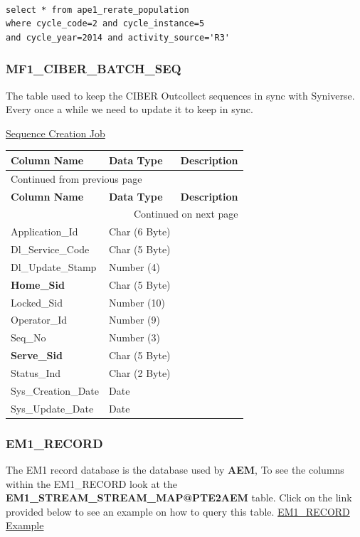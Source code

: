 \documentclass[12pt,twoside]{article}
\begin{document}
\begin{verbatim}

select * from ape1_rerate_population 
where cycle_code=2 and cycle_instance=5 
and cycle_year=2014 and activity_source='R3'
\end{verbatim}

\subsubsection{MF1\_CIBER\_BATCH\_SEQ}
\label{sec:orgheadline82}
The table used to keep the CIBER Outcollect sequences in sync
with Syniverse. Every once a while we need to update it to keep
in sync.

\href{file:///home/dbalchen/workspace/Outcollects/updateSeq.pl}{Sequence Creation Job}

\footnotesize
\begin{longtable}{l|l|l}
\hline
\textbf{Column Name} & \textbf{Data Type} & \textbf{Description}\\
\hline
\endfirsthead
\multicolumn{3}{l}{Continued from previous page} \\
\hline

\textbf{Column Name} & \textbf{Data Type} & \textbf{Description} \\

\hline
\endhead
\hline\multicolumn{3}{r}{Continued on next page} \\
\endfoot
\endlastfoot
\hline
Application\_Id & Char (6 Byte) & \\
Dl\_Service\_Code & Char (5 Byte) & \\
Dl\_Update\_Stamp & Number (4) & \\
\textbf{Home\_Sid} & Char (5 Byte) & \\
Locked\_Sid & Number (10) & \\
Operator\_Id & Number (9) & \\
Seq\_No & Number (3) & \\
\textbf{Serve\_Sid} & Char (5 Byte) & \\
Status\_Ind & Char (2 Byte) & \\
Sys\_Creation\_Date & Date & \\
Sys\_Update\_Date & Date & \\
\hline
\end{longtable}
\normalsize
\subsubsection{EM1\_RECORD}
\label{sec:orgheadline83}
The EM1 record database is the database used by \textbf{AEM}, To see the columns within the EM1\_RECORD look at the \textbf{EM1\_STREAM\_STREAM\_MAP@PTE2AEM} table.
Click on the link provided below to see an example on how to query this table.
  \href{file:///home/dbalchen/workspace/CommonPlace/docs/em1_example.sql}{EM1\_RECORD Example}
\end{document}
